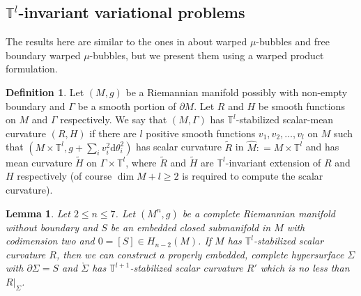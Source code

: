 \documentclass[11pt,letterpaper]{amsart}
\numberwithin{equation}{section}
\newtheorem{lemma}[theorem]{Lemma}
\theoremstyle{definition}
\newtheorem{definition}[theorem]{Definition}
\begin{document}
\subsection{$\mathbb T^l$-invariant variational problems}
The results here are similar to the ones in \cite[Sections 3-4]{CL20} about warped $\mu$-bubbles and free boundary warped $\mu$-bubbles, but we present them using a warped product formulation.
\begin{definition}\label{Defn: stabilized curvature}
Let $(M,g)$ be a Riemannian manifold possibly with non-empty boundary and $\Gamma$ be a smooth portion of $\partial M$. Let $R$ and $H$ be smooth functions on $M$ and $\Gamma$ respectively. We say that $(M,\Gamma)$ has $\mathbb T^l$-stabilized scalar-mean curvature $(R,H)$ if there are $l$ positive smooth functions $v_1,v_2,\ldots,v_l$ on $M$ such that $(M\times \mathbb T^l,g+\sum_i v_i^2\mathrm d\theta_i^2)$ has scalar curvature $\tilde R$ in $\hat M : = M\times \mathbb T^l$ and has mean curvature $\tilde H$ on $\Gamma\times \mathbb T^l$, where $\tilde R$ and $\tilde H$ are $\mathbb T^l$-invariant extension of $R$ and $H$ respectively (of course $\operatorname{dim} M+l\geq 2$ is required to compute the scalar curvature).
\end{definition}
\begin{lemma}\label{Lem: plateau}
Let $2\leq n\leq 7$. Let $(M^n,g)$ be a complete Riemannian manifold {without boundary} and $S$ be an embedded {closed} submanifold in $M$ with codimension two and $0 = [S]\in H_{n-2}(M)$. If $M$ has $\mathbb T^l$-stabilized scalar curvature $R$, then we can construct a properly embedded, complete hypersurface $\Sigma$ with $\partial\Sigma=S$ and $\mathring \Sigma$ has $\mathbb T^{l+1}$-stabilized scalar curvature $R'$ which is no less than $R|_\Sigma$.
\end{lemma}
\end{document}
